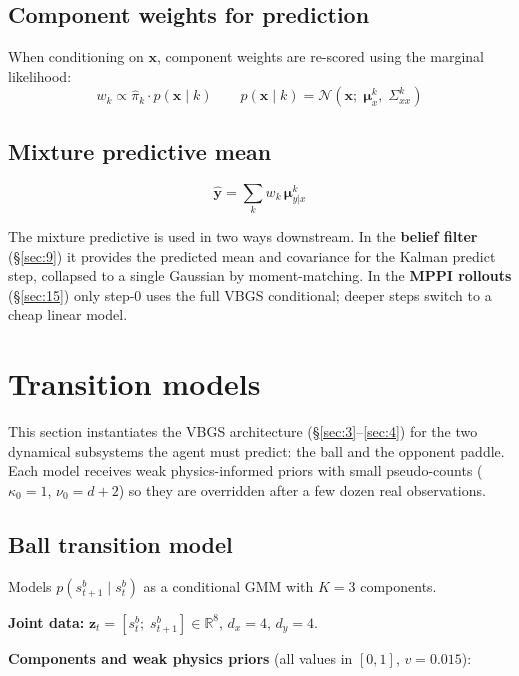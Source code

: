 \documentclass[12pt, a4paper]{article}
\newcommand{\R}{\mathbb{R}}
\newcommand{\1}{\mathbf{1}}
\newcommand{\cN}{\mathcal{N}}
\begin{document}
\subsection{Component weights for prediction}

When conditioning on $\mathbf{x}$, component weights are re-scored using the
marginal likelihood:
\[
w_k \propto \hat\pi_k \cdot p(\mathbf{x} \mid k)
\qquad
p(\mathbf{x}\mid k) = \cN(\mathbf{x};\;\boldsymbol{\mu}_x^k,\;\Sigma_{xx}^k)
\]

\subsection{Mixture predictive mean}
\[
\hat{\mathbf{y}} = \sum_k w_k\,\boldsymbol{\mu}_{y|x}^k
\]

The mixture predictive is used in two ways downstream.  In the
\textbf{belief filter} (\S\ref{sec:9}) it provides the predicted mean and
covariance for the Kalman predict step, collapsed to a single Gaussian by
moment-matching.  In the \textbf{MPPI rollouts} (\S\ref{sec:15}) only step-0
uses the full VBGS conditional; deeper steps switch to a cheap linear model.

\section{Transition models}
\label{sec:5}

This section instantiates the VBGS architecture (\S\ref{sec:3}--\ref{sec:4}) for
the two dynamical subsystems the agent must predict: the ball and the opponent
paddle.  Each model receives weak physics-informed priors with small pseudo-counts
($\kappa_0 = 1$, $\nu_0 = d+2$) so they are overridden after a few dozen
real observations.

\subsection{Ball transition model}

Models $p(s^b_{t+1} \mid s^b_t)$ as a conditional GMM with $K=3$ components.

\textbf{Joint data:} $\mathbf{z}_t = [s^b_t;\; s^b_{t+1}] \in \R^8$,
$d_x = 4$, $d_y = 4$.

\textbf{Components and weak physics priors} (all values in $[0,1]$, $v = 0.015$):
\end{document}
